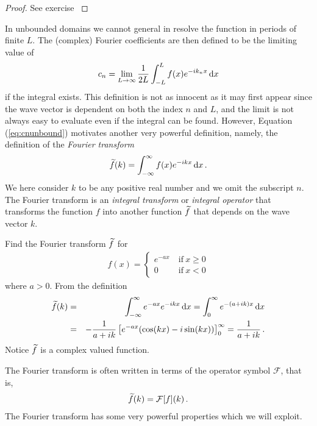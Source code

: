 \begin{proof}
	See exercise \label{missingproof}
\end{proof}

In unbounded domains we cannot general in resolve the function in periods of finite $L$. The (complex) Fourier
coefficients are then defined to be the limiting value of
\begin{eqnarray}
	\label{eq:cnunbound}
	c_n = \lim_{L\rightarrow \infty} \frac{1}{2L} \int_{-L}^L f(x) e^{-ik_n x}
	\, \mathrm{d} x  
\end{eqnarray}
if the integral exists. This definition is not as innocent as it may first appear since the wave vector is dependent on 
both the index $n$ and $L$, and the limit is not always easy to evaluate even if the integral can be found. 
However, Equation (\ref{eq:cnunbound}) motivates another very powerful definition, namely, the
definition of the \emph{Fourier transform} 
\begin{eqnarray}
	\widetilde{f}(k) = \int_{-\infty}^\infty  f(x) e^{-ik x} \, \mathrm{d} x \, .
\end{eqnarray}
We here consider $k$ to be any positive real number and we omit the subscript $n$. 
The Fourier transform is an \emph{integral transform} or \emph{integral operator} that transforms the function $f$ into 
another function $\widetilde{f}$ that depends on the wave vector $k$. 

\begin{example}
	Find the Fourier transform $\widetilde{f}$ for 
	\begin{eqnarray}
		f(x) = \left\{
			\begin{array}{ll}
				e^{-a x} & \ \text{if} \ x \geq 0 \\
				0 & \ \text{if} \ x < 0
			\end{array}
		\right.
	\end{eqnarray}
	where $a > 0$. From the definition
	\begin{eqnarray}
		\widetilde{f}(k) &=& \int_{-\infty}^\infty e^{-ax}  e^{-ik x} \, \mathrm{d} x = \int_0^\infty e^{-(a+ik)x}\, \mathrm{d} x 
		\nonumber \\
		&=& - \frac{1}{a+ik} \left[e^{-ax}(\cos(kx) - i\sin(kx))\right]_{0}^\infty = \frac{1}{a+ik} \, .
	\end{eqnarray}
	Notice $\widetilde{f}$ is a complex valued function. 
\end{example}	

\noindent The Fourier transform is often written in terms of the operator symbol $\mathcal{F}$, that is, 
\begin{eqnarray}
	\widetilde{f}(k) = \mathcal{F}[f](k) \, .
\end{eqnarray}
The Fourier transform has some very powerful properties which we will exploit.  

